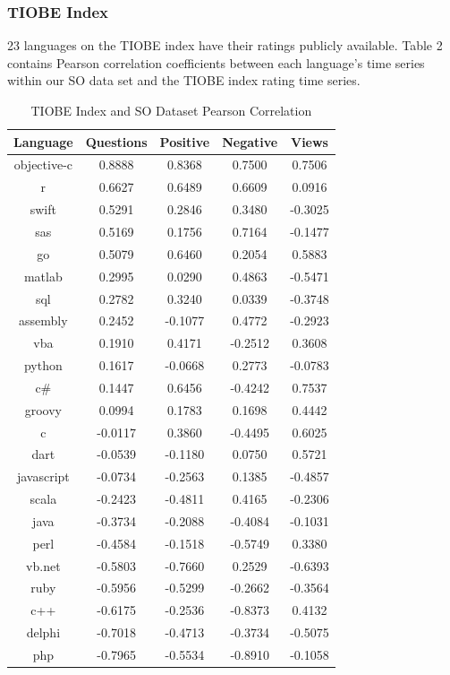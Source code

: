 \documentclass[conference]{IEEEtran}
\begin{document}
\subsubsection{TIOBE Index}
23 languages on the TIOBE index have their ratings publicly available. Table 2 contains Pearson correlation coefficients between each language's time series within our SO data set and the TIOBE index rating time series.

\begin{table}[htbp]
\caption{TIOBE Index and SO Dataset Pearson Correlation}
\begin{center}
\begin{tabular}{|c|c|c|c|c|}
\hline
\textbf{Language} & \textbf{Questions} & \textbf{Positive} & \textbf{Negative} & \textbf{Views} \\
\hline
 objective-c &  0.8888 &  0.8368 &  0.7500 &  0.7506 \\
 \hline
 r &  0.6627 &  0.6489 &  0.6609 &  0.0916 \\
 \hline
 swift &  0.5291 &  0.2846 &  0.3480 & -0.3025 \\
 \hline
 sas &  0.5169 &  0.1756 &  0.7164 & -0.1477 \\
 \hline
 go &  0.5079 &  0.6460 &  0.2054 &  0.5883 \\
 \hline
 matlab &  0.2995 &  0.0290 &  0.4863 & -0.5471 \\
 \hline
 sql &  0.2782 &  0.3240 &  0.0339 & -0.3748 \\
 \hline
 assembly &  0.2452 & -0.1077 &  0.4772 & -0.2923 \\
 \hline
 vba &  0.1910 &  0.4171 & -0.2512 &  0.3608 \\
 \hline
 python &  0.1617 & -0.0668 &  0.2773 & -0.0783 \\
 \hline
 c\# &  0.1447 &  0.6456 & -0.4242 &  0.7537 \\
 \hline
 groovy &  0.0994 &  0.1783 &  0.1698 &  0.4442 \\
 \hline
 c & -0.0117 &  0.3860 & -0.4495 &  0.6025 \\
 \hline
 dart & -0.0539 & -0.1180 &  0.0750 &  0.5721 \\
 \hline
 javascript & -0.0734 & -0.2563 &  0.1385 & -0.4857 \\
 \hline
 scala & -0.2423 & -0.4811 &  0.4165 & -0.2306 \\
 \hline
 java & -0.3734 & -0.2088 & -0.4084 & -0.1031 \\
 \hline
 perl & -0.4584 & -0.1518 & -0.5749 &  0.3380 \\
 \hline
 vb.net & -0.5803 & -0.7660 &  0.2529 & -0.6393 \\
 \hline
 ruby & -0.5956 & -0.5299 & -0.2662 & -0.3564 \\
 \hline
 c++ & -0.6175 & -0.2536 & -0.8373 &  0.4132 \\
 \hline
 delphi & -0.7018 & -0.4713 & -0.3734 & -0.5075 \\
 \hline
 php & -0.7965 & -0.5534 & -0.8910 & -0.1058 \\
 \hline
\end{tabular}
\label{tab1}
\end{center}
\end{table}
\end{document}
